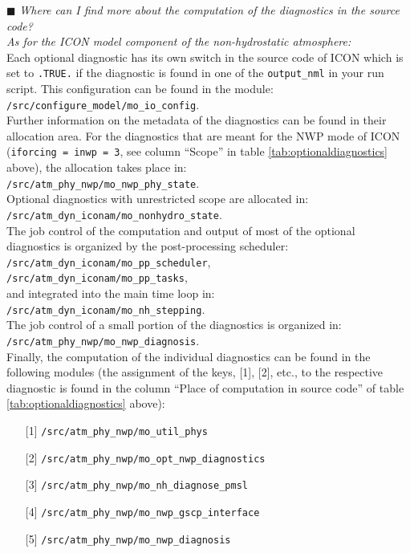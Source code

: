 $\blacksquare$ \emph{Where can I find more about the computation of the diagnostics in the source code?} \\

\emph{As for the ICON model component of the non-hydrostatic atmosphere:}\\

Each optional diagnostic has its own switch in the source code of ICON 
which is set to \texttt{.TRUE.} if the diagnostic is found in one of the \texttt{output\_nml} in your run script. 
This configuration can be found in the module: \\
\texttt{/src/configure\_model/mo\_io\_config}. \\

Further information on the metadata of the diagnostics can be found 
in their allocation area. 
For the diagnostics that are meant for the NWP mode of ICON 
(\texttt{iforcing = inwp = 3}, see column ``Scope'' in table \ref{tab:optionaldiagnostics} above), 
the allocation takes place in:\\
\texttt{/src/atm\_phy\_nwp/mo\_nwp\_phy\_state}.\\
Optional diagnostics with unrestricted scope are allocated in:\\
\texttt{/src/atm\_dyn\_iconam/mo\_nonhydro\_state}.\\

The job control of the computation and output of most of the optional diagnostics 
is organized by the post-processing scheduler:\\
\texttt{/src/atm\_dyn\_iconam/mo\_pp\_scheduler}, \\
\texttt{/src/atm\_dyn\_iconam/mo\_pp\_tasks}, \\
and integrated into the main time loop in:\\
\texttt{/src/atm\_dyn\_iconam/mo\_nh\_stepping}.\\
The job control of a small portion of the diagnostics 
is organized in: \\
\texttt{/src/atm\_phy\_nwp/mo\_nwp\_diagnosis}.\\

Finally, the computation of the individual diagnostics can be found 
in the following modules 
(the assignment of the keys, {[1]}, {[2]}, etc., to the respective diagnostic 
is found in the column ``Place of computation in source code'' of table \ref{tab:optionaldiagnostics} above):
%
\begin{itemize}
\setlength\itemsep{-0.3em}
\item[{[1]}] \texttt{/src/atm\_phy\_nwp/mo\_util\_phys}
\item[{[2]}] \texttt{/src/atm\_phy\_nwp/mo\_opt\_nwp\_diagnostics}
\item[{[3]}] \texttt{/src/atm\_phy\_nwp/mo\_nh\_diagnose\_pmsl} 
\item[{[4]}] \texttt{/src/atm\_phy\_nwp/mo\_nwp\_gscp\_interface}
\item[{[5]}] \texttt{/src/atm\_phy\_nwp/mo\_nwp\_diagnosis}
\end{itemize}
%

